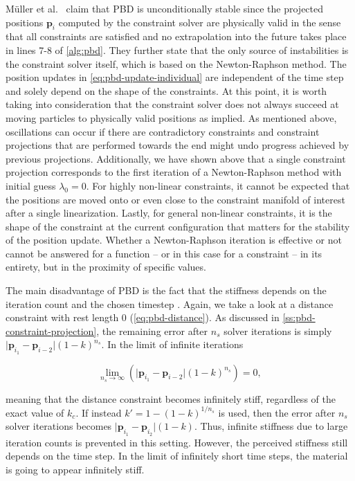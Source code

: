Müller et al.\ \cite{mueller2006} claim that PBD is unconditionally stable since the projected positions $\bm{p}_i$ computed by the constraint 
solver are physically valid in the sense that all constraints are satisfied and no extrapolation into the future takes place in lines 7-8 of
\cref{alg:pbd}. They further state that the only source of instabilities is the constraint solver itself, which is based on the Newton-Raphson 
method. The position updates in \cref{eq:pbd-update-individual} are independent of the time step and solely depend on the shape of the
constraints. At this point, it is worth taking into consideration that the constraint solver does not always succeed at moving particles to 
physically valid
positions as implied. As mentioned above, oscillations can occur if there are contradictory constraints and constraint projections that are 
performed towards the end might undo progress achieved by previous projections. Additionally, we have shown above that a single constraint 
projection corresponds to the first iteration of a Newton-Raphson method with initial guess $\lambda_0 = 0$. For highly non-linear constraints, 
it cannot be expected that the positions are moved onto or even close to the constraint manifold of interest after a single linearization. 
Lastly, for general non-linear constraints, it is the shape of the constraint at the current configuration that matters for the stability of 
the position update. Whether a Newton-Raphson iteration is effective or not cannot be answered for a function -- or in this case for a 
constraint -- in its entirety, but in the proximity of specific values.

The main disadvantage of PBD is the fact that the stiffness depends on the iteration count and the chosen timestep \cite{mueller2006}. Again, 
we take a look at
a distance constraint with rest length 0 (\cref{eq:pbd-distance}). As discussed in \cref{ss:pbd-constraint-projection}, the remaining error after
$n_s$ solver iterations is simply $\vert \bm{p}_{i_1} - \bm{p}_{i-2} \vert (1-k)^{n_s}$. In the limit of infinite iterations

\[
    \lim_{n_s \to \infty} (\vert \bm{p}_{i_1} - \bm{p}_{i-2} \vert (1-k)^{n_s}) = 0,
\]

\noindent meaning that the distance constraint becomes infinitely stiff, regardless of the exact value of $k_c$. If instead $k\prime 
= 1 - (1-k)^{1/n_s}$ is used, then the error after $n_s$ solver iterations becomes $\vert \bm{p}_{i_1} - \bm{p}_{i_2} \vert (1-k)$. Thus,
infinite stiffness due to large iteration counts is prevented in this setting. However, the perceived stiffness still depends on the time
step. In the limit of infinitely short time steps, the material is going to appear infinitely stiff. 

